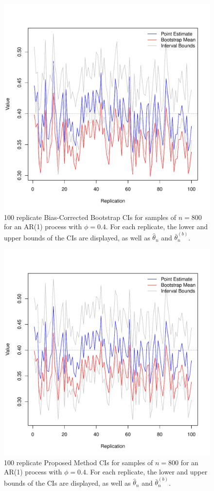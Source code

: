 \documentclass[12pt, letterpaper, titlepage]{article}
\begin{document}
\begin{figure}[tbp]
  \centering
  \includegraphics[width=\textwidth]{figures/bc}
  \caption{100 replicate Bias-Corrected Bootstrap CIs for samples of $n = 800$ for
    an AR(1) process with $\phi = 0.4$. For each replicate, the lower and upper bounds
    of the CIs are displayed, as well as $\hat\theta_n$ and $\bar\theta_n^{(b)}$.}
  \label{fig:bc}
\end{figure}

\begin{figure}[tbp]
  \centering
  \includegraphics[width=\textwidth]{figures/prop}
  \caption{100 replicate Proposed Method CIs for samples of $n = 800$ for
    an AR(1) process with $\phi = 0.4$. For each replicate, the lower and upper bounds
    of the CIs are displayed, as well as $\hat\theta_n$ and $\bar\theta_n^{(b)}$.}
  \label{fig:prop}
\end{figure}
\end{document}
